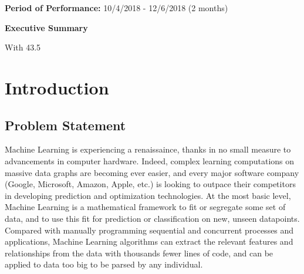 \documentclass[12pt]{article}
\begin{document}
\begin{flushleft}

	\item{\bfseries Period of Performance:} 10/4/2018 - 12/6/2018 (2 months)\\[48pt]

	\begin{center}
		\Large{\bfseries Executive Summary }\\[11pt]
	\end{center}

\end{flushleft}

With 43.5%


\newpage\tableofcontents


\newpage
{}
\clearpage
\setcounter{page}{1}

\section{Introduction}

	\subsection{Problem Statement}\hspace{4ex}Machine Learning is experiencing a renaissaince, thanks in no small measure to advancements in computer hardware. Indeed, complex learning computations on massive data graphs are becoming ever easier, and every major software company (Google, Microsoft, Amazon, Apple, etc.) is looking to outpace their competitors in developing prediction and optimization technologies. At the most basic level, Machine Learning is a mathematical framework to fit or segregate some set of data, and to use this fit for prediction or classification on new, unseen datapoints. Compared with manually programming sequential and concurrent processes and applications, Machine Learning algorithms can extract the relevant features and relationships from the data with thousands fewer lines of code, and can be applied to data too big to be parsed by any individual. 
	
\end{document}
